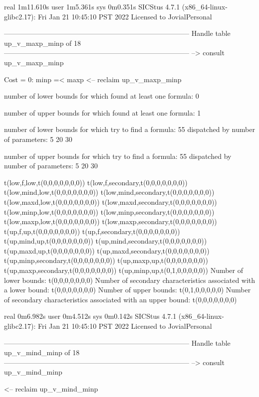 real	1m11.610s
user	1m5.361s
sys	0m0.351s
SICStus 4.7.1 (x86_64-linux-glibc2.17): Fri Jan 21 10:45:10 PST 2022
Licensed to JovialPersonal


--------------------------------------------------------------------------------
Handle table up_v_maxp_minp of 18
--------------------------------------------------------------------------------
--> consult up_v_maxp_minp

Cost =  0:  minp =< maxp
<-- reclaim up_v_maxp_minp

number of lower bounds for which found at least one formula: 0

number of upper bounds for which found at least one formula: 1

number of lower bounds for which try to find a formula: 55
dispatched by number of parameters: 5  20  30

number of upper bounds for which try to find a formula: 55
dispatched by number of parameters: 5  20  30

t(low,f,low,t(0,0,0,0,0,0,0))
t(low,f,secondary,t(0,0,0,0,0,0,0))
t(low,mind,low,t(0,0,0,0,0,0,0))
t(low,mind,secondary,t(0,0,0,0,0,0,0))
t(low,maxd,low,t(0,0,0,0,0,0,0))
t(low,maxd,secondary,t(0,0,0,0,0,0,0))
t(low,minp,low,t(0,0,0,0,0,0,0))
t(low,minp,secondary,t(0,0,0,0,0,0,0))
t(low,maxp,low,t(0,0,0,0,0,0,0))
t(low,maxp,secondary,t(0,0,0,0,0,0,0))
t(up,f,up,t(0,0,0,0,0,0,0))
t(up,f,secondary,t(0,0,0,0,0,0,0))
t(up,mind,up,t(0,0,0,0,0,0,0))
t(up,mind,secondary,t(0,0,0,0,0,0,0))
t(up,maxd,up,t(0,0,0,0,0,0,0))
t(up,maxd,secondary,t(0,0,0,0,0,0,0))
t(up,minp,secondary,t(0,0,0,0,0,0,0))
t(up,maxp,up,t(0,0,0,0,0,0,0))
t(up,maxp,secondary,t(0,0,0,0,0,0,0))
t(up,minp,up,t(0,1,0,0,0,0,0))
Number of lower bounds:                                             t(0,0,0,0,0,0,0)
Number of secondary characteristics associated with a lower bound:  t(0,0,0,0,0,0,0)
Number of upper bounds:                                             t(0,1,0,0,0,0,0)
Number of secondary characteristics associated with an upper bound: t(0,0,0,0,0,0,0)

real	0m6.982s
user	0m4.512s
sys	0m0.142s
SICStus 4.7.1 (x86_64-linux-glibc2.17): Fri Jan 21 10:45:10 PST 2022
Licensed to JovialPersonal


--------------------------------------------------------------------------------
Handle table up_v_mind_minp of 18
--------------------------------------------------------------------------------
--> consult up_v_mind_minp

<-- reclaim up_v_mind_minp

